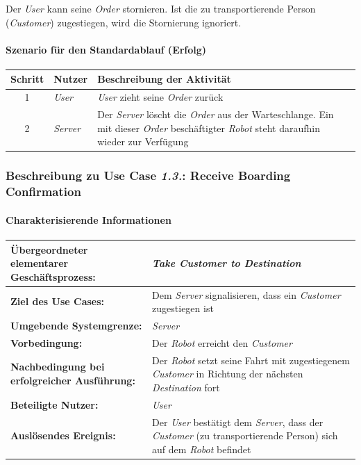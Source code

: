 			Der \emph{User} kann seine \emph{Order} stornieren. Ist die zu transportierende Person (\emph{Customer}) zugestiegen, wird die Stornierung ignoriert.

			\paragraph*{Szenario für den Standardablauf (Erfolg)}

			\begin{table}[H]
				\centering
				\begin{tabularx}{\textwidth}{|c|p{2cm}|X|}
					\hline
					Schritt & Nutzer & Beschreibung der Aktivität \\ \hline
					1 & \emph{User} & \emph{User} zieht seine \emph{Order} zurück \\
					2 & \emph{Server} & Der \emph{Server} löscht die \emph{Order} aus der Warteschlange. Ein mit dieser \emph{Order} beschäftigter \emph{Robot} steht daraufhin wieder zur Verfügung \\
					\hline
				\end{tabularx}
			\end{table}


			\pagebreak

			\subsubsection{Beschreibung zu Use Case \emph{1.3.}: Receive Boarding Confirmation}
				\paragraph*{Charakterisierende Informationen}

				\begin{table}[H]
					\centering
					\begin{tabularx}{\textwidth}{|p{5cm}|X|}
						\hline
						\textbf{Übergeordneter elementarer Geschäftsprozess:} & \emph{Take Customer to Destination} \\ \hline
						\textbf{Ziel des Use Cases:} & Dem \emph{Server} signalisieren, dass ein \emph{Customer} zugestiegen ist \\ \hline
						\textbf{Umgebende Systemgrenze:} & \emph{Server} \\ \hline
						\textbf{Vorbedingung:} & Der \emph{Robot} erreicht den \emph {Customer} \\ \hline
						\textbf{Nachbedingung bei erfolgreicher Ausführung:} & Der \emph{Robot} setzt seine Fahrt mit zugestiegenem \emph{Customer} in Richtung der nächsten \emph{Destination} fort \\ \hline
						\textbf{Beteiligte Nutzer:} & \emph{User} \\ \hline
						\textbf{Auslösendes Ereignis:} & Der \emph{User} bestätigt dem \emph{Server}, dass der \emph{Customer} (zu transportierende Person) sich auf dem \emph{Robot} befindet \\
						\hline
					\end{tabularx}
				\end{table}

